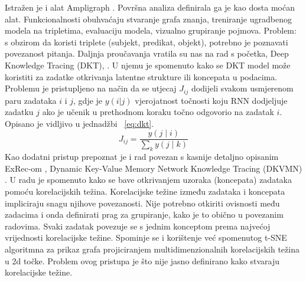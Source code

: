 \newline
Istražen je i alat Ampligraph \citep{ampl1, ampl2}. Površna analiza definirala ga je kao dosta moćan alat. Funkcionalnosti obuhvaćaju stvaranje grafa znanja, treniranje ugradbenog modela na tripletima, evaluaciju modela, vizualno grupiranje pojmova.
Problem: s obzirom da koristi triplete (subjekt, predikat, objekt), potrebno je poznavati povezanost pitanja.\newline
\newline
Daljnja proučavanja vratila su nas na rad s početka, Deep Knowledge Tracing (DKT), \citep{dkt}. U njemu je spomenuto kako se DKT model može koristiti za zadatke otkrivanja latentne strukture ili koncepata u podacima. Problemu je pristupljeno na način da se utjecaj $J_{ij}$ dodijeli svakom usmjerenom paru zadataka $i$ i $j$, gdje je $y(i | j)$ vjerojatnost točnosti koju RNN dodjeljuje zadatku $j$ ako je učenik u prethodnom koraku točno odgovorio na zadatak $i$. Opisano je vidljivo u jednadžbi ~\ref{eq:dkt}.
\begin{equation}
J_{i j}=\frac{y(j \mid i)}{\sum_{k} y(j \mid k)}\label{eq:dkt}
\end{equation}
\newline
Kao dodatni pristup prepoznat je i rad povezan s kasnije detaljno opisanim ExRec-om \citep{exrec}, Dynamic Key-Value Memory Network Knowledge Tracing (DKVMN) \citep{dkvmn}. U radu je spomenuto kako se bave otkrivanjem uzoraka (koncepata) zadataka pomoću korelacijskih težina. Korelacijske težine između zadataka i koncepata impliciraju snagu njihove povezanosti. Nije potrebno otkiriti ovisnosti među zadacima i onda definirati prag za grupiranje, kako je to obično u povezanim radovima. Svaki zadatak povezuje se s jednim konceptom prema najvećoj vrijednosti korelacijske težine. Spominje se i korištenje već spomenutog t-SNE algoritmna \citep{tdsne} za prikaz grafa projiciranjem multidimenzionalnih korelacijskih težina u 2d točke. Problem ovog pristupa je što nije jasno definirano kako stvaraju korelacijske težine. 